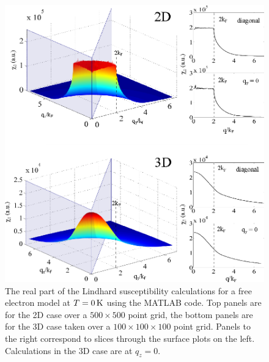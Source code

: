 \begin{figure}[htbp]
    \begin{center}
        \includegraphics[scale=0.9]{Chapter-dHvABaFe2P2/Figures/AngleDepMeasurements/SusceptibilityFreeElectron/SusceptibilityFreeElectron}
        \caption{The real part of the Lindhard susceptibility calculations for a free electron model at $T=\unit[0]{K}$ using the MATLAB  code. Top panels are for the 2D case over a $500\times500$ point grid, the bottom panels are for the 3D case taken over a $100\times100\times100$ point grid. Panels to the right correspond to slices through the surface plots on the left. Calculations in the 3D case are at $q_z=0$.}
        \label{Fig:Exp:FreeElectronSusceptibility}
    \end{center}
\end{figure}


